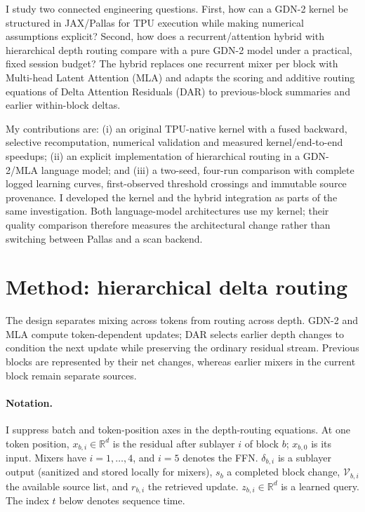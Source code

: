 \documentclass[10pt,a4paper]{article}
\begin{document}
I study two connected engineering questions. First, how can a GDN-2 kernel be
structured in JAX/Pallas for TPU execution while making numerical assumptions explicit?
Second, how does a recurrent/attention hybrid with hierarchical depth routing compare
with a pure GDN-2 model under a practical, fixed session budget? The hybrid replaces
one recurrent mixer per block with Multi-head Latent Attention (MLA) \cite{deepseek} and
adapts the scoring and additive routing equations of Delta Attention Residuals (DAR)
\cite{dar} to previous-block summaries and earlier within-block deltas.

My contributions are: (i) an original TPU-native kernel with a fused backward, selective
recomputation, numerical validation and measured kernel/end-to-end speedups; (ii) an explicit implementation of hierarchical routing in a
GDN-2/MLA language model; and (iii) a two-seed, four-run comparison with complete logged
learning curves, first-observed threshold crossings and immutable source provenance.
I developed the kernel and the hybrid integration as parts of the same investigation.
Both language-model architectures use my kernel; their quality comparison therefore
measures the architectural change rather than switching between Pallas and a scan backend.


\section{Method: hierarchical delta routing}\label{sec:method}
The design separates mixing across tokens from routing across depth. GDN-2 and MLA
compute token-dependent updates; DAR selects earlier depth changes to condition the
next update while preserving the ordinary residual stream. Previous blocks are represented
by their net changes, whereas earlier mixers in the current block remain separate sources.

\paragraph{Notation.}
I suppress batch and token-position axes in the depth-routing equations. At one token
position, $x_{b,i}\in\mathbb R^d$ is the residual after sublayer $i$ of block $b$;
$x_{b,0}$ is its input. Mixers have $i=1,\ldots,4$, and $i=5$ denotes the FFN.
$\delta_{b,i}$ is a sublayer output (sanitized and stored locally for mixers), $s_b$ a completed block change,
$\mathcal V_{b,i}$ the available source list, and $r_{b,i}$ the retrieved update.
$z_{b,i}\in\mathbb R^d$ is a learned query. The index $t$ below denotes sequence time.
\end{document}
